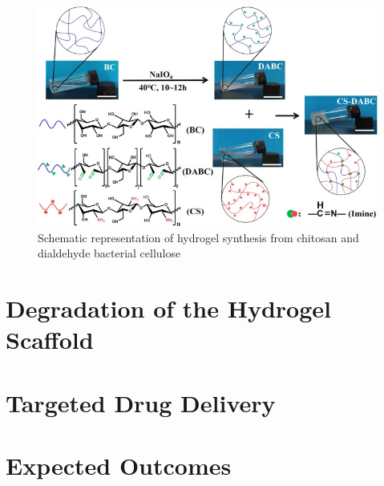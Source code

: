 \documentclass[
    letterpaper,
    10pt,
    unnumberedsections,
    twoside
]{LTJournalArticle}
\begin{document}
    \begin{figure}[b]
        \centering 
        \includegraphics[width=0.7\linewidth]{Figures/CS_DABC_condensation.jpg}
        \caption{Schematic representation of hydrogel synthesis from chitosan and dialdehyde bacterial cellulose \autocite{liAllnaturalInjectableHydrogel2020}}
        \label{fig:CS_DABC_condensation}
    \end{figure}

    


    

    \section{Degradation of the Hydrogel Scaffold}

    

    \section{Targeted Drug Delivery}

    


    

    \section{Expected Outcomes}

    

    \onecolumn
    \printbibliography
\end{document}
